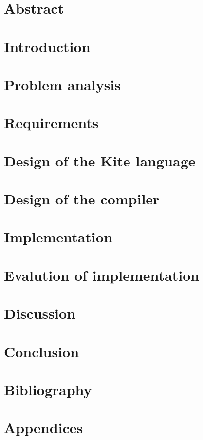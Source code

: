 \documentclass{article}
\begin{document}

\clearpage

\section*{Abstract}

\clearpage

\tableofcontents
\clearpage

\section{Introduction}

\clearpage

\section{Problem analysis}
\label{sec:probanal}

\clearpage

\section{Requirements}
\label{sec:requirements}

\clearpage

\section{Design of the Kite language}
\label{sec:kite-design}

\clearpage

\section{Design of the compiler}
\label{sec:compiler-design}

\clearpage

\section{Implementation}
\label{sec:impl}

\clearpage

\section{Evalution of implementation}
\label{sec:evaluation}

\clearpage

\section{Discussion}
\label{sec:discussion}

\clearpage

\section{Conclusion}
\label{sec:conclusion}

\clearpage

\section{Bibliography}

\clearpage

\section{Appendices}

\end{document}
